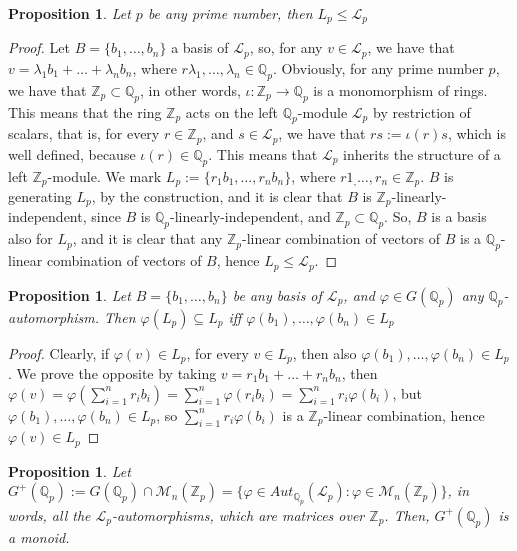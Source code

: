 \documentclass[12pt]{article}
\newtheorem{proposition}[theorem]{Proposition}
\begin{document}
\begin{proposition}
\label{prop.integers.subalgebra.rationals}
Let $p$ be any prime number, then $L_p\leq\mathcal{L}_p$
\end{proposition}
\begin{proof}
Let $B=\{b_1,\dots,b_n\}$ a basis of $\mathcal{L}_p$, so, for any $v\in\mathcal{L}_p$, we have that $v=\lambda_1b_1+\dots+\lambda_nb_n$, where $r\lambda_1,\dots,\lambda_n\in\mathbb{Q}_p$. Obviously, for any prime number $p$, we have that $\mathbb{Z}_p\subset\mathbb{Q}_p$, in other words, $\iota:\mathbb{Z}_p\rightarrow\mathbb{Q}_p$ is a monomorphism of rings. This means that the ring $\mathbb{Z}_p$ acts on the left $\mathbb{Q}_p$-module $\mathcal{L}_p$ by restriction of scalars, that is, for every $r\in\mathbb{Z}_p$, and $s\in\mathcal{L}_p$, we have that $rs:=\iota(r)s$, which is well defined, because $\iota(r)\in\mathbb{Q}_p$. This means that $\mathcal{L}_p$ inherits the structure of a left $\mathbb{Z}_p$-module. We mark $L_p:=\{r_1b_1,\dots,r_nb_n\}$, where $r1_,
\dots,r_n\in\mathbb{Z}_p$. $B$ is generating $L_p$, by the construction, and it is clear that $B$ is $\mathbb{Z}_p$-linearly-independent, since $B$ is $\mathbb{Q}_p$-linearly-independent, and $\mathbb{Z}_p\subset\mathbb{Q}_p$. So, $B$ is a basis also for $L_p$, and it is clear that any $\mathbb{Z}_p$-linear combination of vectors of $B$ is a $\mathbb{Q}_p$-linear combination of vectors of $B$, hence $L_p\leq\mathcal{L}_p$.
\end{proof}
\begin{proposition}
\label{prop.integer.automorphism}
Let $B=\{b_1,\dots,b_n\}$ be any basis of $\mathcal{L}_p$, and $\varphi\in G(\mathbb{Q}_p)$ any $\mathbb{Q}_p$-automorphism. Then $\varphi(L_p)\subseteq L_p$ iff $\varphi(b_1),\dots,\varphi(b_n)\in L_p$
\end{proposition}
\begin{proof}
Clearly, if $\varphi(v)\in L_p$, for every $v\in L_p$, then also $\varphi(b_1),\dots,\varphi(b_n)\in L_p$. We prove the opposite by taking $v=r_1b_1+\dots+r_nb_n$, then $\varphi(v)=\varphi(\sum_{i=1}^nr_ib_i)=\sum_{i=1}^n\varphi(r_ib_i)=\sum_{i=1}^nr_i\varphi(b_i)$, but $\varphi(b_1),\dots,\varphi(b_n)\in L_p$, so $\sum_{i=1}^nr_i\varphi(b_i)$ is a $\mathbb{Z}_p$-linear combination, hence $\varphi(v)\in L_p$
\end{proof}
\begin{proposition}
\label{prop.monoid}
Let $G^{+}(\mathbb{Q}_p):=G(\mathbb{Q}_p)\cap\mathcal{M}_n(\mathbb{Z}_p)=\{\varphi\in Aut_{\mathbb{Q}_p}(\mathcal{L}_p) : \varphi\in\mathcal{M}_n(\mathbb{Z}_p)\}$, in words, all the $\mathcal{L}_p$-automorphisms, which are matrices over $\mathbb{Z}_p$. Then, $G^{+}(\mathbb{Q}_p)$ is a monoid.
\end{proposition}
\end{document}
